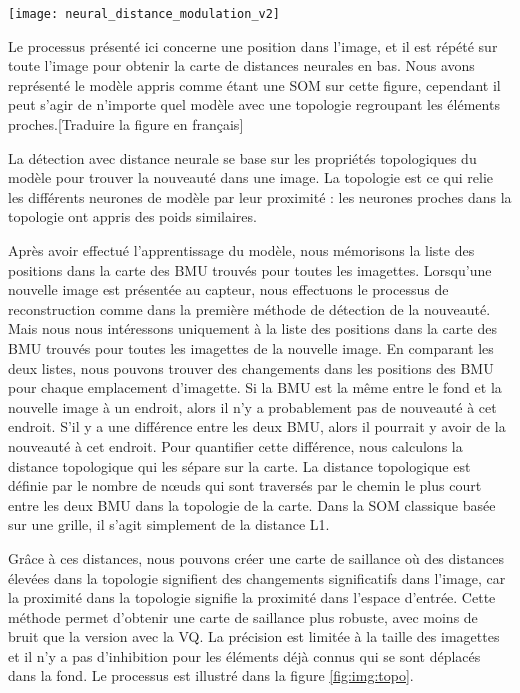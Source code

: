 	\begin{figureth}
		\texttt{[image: neural\_distance\_modulation\_v2]}
		\caption[Détection de nouveauté avec topologie]{Le processus présenté ici concerne une position dans l'image, et il est répété sur toute l'image pour obtenir la carte de distances neurales en bas. Nous avons représenté le modèle appris comme étant une SOM sur cette figure, cependant il peut s'agir de n'importe quel modèle avec une topologie regroupant les éléments proches.[Traduire la figure en français]}\label{fig:img:topo}
	\end{figureth}

	La détection avec distance neurale se base sur les propriétés topologiques du modèle pour trouver la nouveauté dans une image. La topologie est ce qui relie les différents neurones de modèle par leur proximité : les neurones proches dans la topologie ont appris des poids similaires.

	Après avoir effectué l'apprentissage du modèle, nous mémorisons la liste des positions dans la carte des BMU trouvés pour toutes les imagettes. Lorsqu'une nouvelle image est présentée au capteur, nous effectuons le processus de reconstruction comme dans la première méthode de détection de la nouveauté. Mais nous nous intéressons uniquement à la liste des positions dans la carte des BMU trouvés pour toutes les imagettes de la nouvelle image. En comparant les deux listes, nous pouvons trouver des changements dans les positions des BMU pour chaque emplacement d'imagette. Si la BMU est la même entre le fond et la nouvelle image à un endroit, alors il n'y a probablement pas de nouveauté à cet endroit. S'il y a une différence entre les deux BMU, alors il pourrait y avoir de la nouveauté à cet endroit. Pour quantifier cette différence, nous calculons la distance topologique qui les sépare sur la carte. La distance topologique est définie par le nombre de nœuds qui sont traversés par le chemin le plus court entre les deux BMU dans la topologie de la carte. Dans la SOM classique basée sur une grille, il s'agit simplement de la distance L1.

	Grâce à ces distances, nous pouvons créer une carte de saillance où des distances élevées dans la topologie signifient des changements significatifs dans l'image, car la proximité dans la topologie signifie la proximité dans l'espace d'entrée. Cette méthode permet d'obtenir une carte de saillance plus robuste, avec moins de bruit que la version avec la VQ. La précision est limitée à la taille des imagettes et il n'y a pas d'inhibition pour les éléments déjà connus qui se sont déplacés dans la fond. Le processus est illustré dans la figure \ref{fig:img:topo}.

